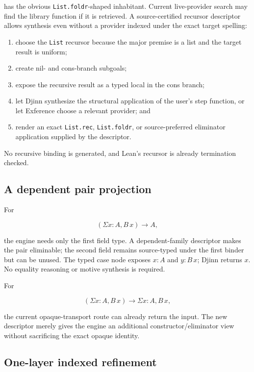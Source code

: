 \documentclass[11pt]{article}
\newcommand{\code}[1]{\texttt{#1}}
\newcommand{\Djinn}{Djinn}
\newcommand{\Exference}{Exference}
\begin{document}
has the obvious \code{List.foldr}-shaped inhabitant.  Current live-provider
search may find the library function if it is retrieved.  A source-certified
recursor descriptor allows synthesis even without a provider indexed under the
exact target spelling:

\begin{enumerate}
  \item choose the \code{List} recursor because the major premise is a list and
    the target result is uniform;
  \item create nil- and cons-branch subgoals;
  \item expose the recursive result as a typed local in the cons branch;
  \item let \Djinn{} synthesize the structural application of the user's step
    function, or let \Exference{} choose a relevant provider; and
  \item render an exact \code{List.rec}, \code{List.foldr}, or source-preferred
    eliminator application supplied by the descriptor.
\end{enumerate}

No recursive binding is generated, and Lean's recursor is already termination
checked.

\subsection{A dependent pair projection}

For

\[
  (\Sigma x : A, B\,x) \to A,
\]

the engine needs only the first field type.  A dependent-family descriptor
makes the pair eliminable; the second field remains source-typed under the
first binder but can be unused.  The typed case node exposes
\(x:A\) and \(y:B\,x\); \Djinn{} returns \(x\).  No equality reasoning or
motive synthesis is required.

For

\[
  (\Sigma x : A, B\,x) \to \Sigma x : A, B\,x,
\]

the current opaque-transport route can already return the input.  The new
descriptor merely gives the engine an additional constructor/eliminator view
without sacrificing the exact opaque identity.

\subsection{One-layer indexed refinement}
\end{document}
